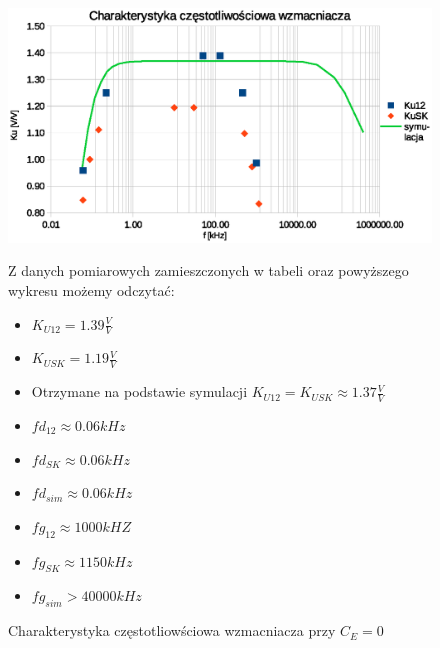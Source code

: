 \documentclass[a4paper,12pt]{article}
\begin{document}
\begin{figure}[h!]
  \begin{center}
  \includegraphics[width=1\textwidth]{g2.eps}
  \caption{Charakterystyka częstotliowściowa wzmacniacza przy $C_E = 0$}
  \end{center}
  
    Z danych pomiarowych zamieszczonych w tabeli oraz powyższego wykresu możemy odczytać:
  \begin{itemize}
  \item $K_{U12} = 1.39 \frac{V}{V}$
  \item $K_{USK} = 1.19 \frac{V}{V}$
  \item Otrzymane na podstawie symulacji $K_{U12}=K_{USK}\approx 1.37\frac{V}{V}$
  \item $fd_{12} \approx 0.06kHz$
  \item $fd_{SK} \approx 0.06kHz$
  \item $fd_{sim} \approx 0.06kHz$
  \item $fg_{12} \approx 1000kHZ$
  \item $fg_{SK} \approx 1150kHz$
  \item $fg_{sim} > 40000kHz$
  
  \end{itemize}

\end{figure}
\end{document}
